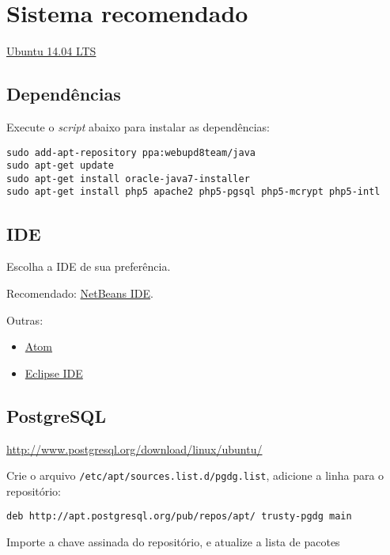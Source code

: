 \section{Sistema recomendado}\label{sistema-recomendado}

\href{http://www.ubuntu.com/download/desktop/}{Ubuntu 14.04 LTS}

\subsection{Dependências}\label{dependuxeancias}

Execute o \emph{script} abaixo para instalar as dependências:

\begin{verbatim}
sudo add-apt-repository ppa:webupd8team/java
sudo apt-get update
sudo apt-get install oracle-java7-installer
sudo apt-get install php5 apache2 php5-pgsql php5-mcrypt php5-intl
\end{verbatim}

\subsection{IDE}\label{ide}

Escolha a IDE de sua preferência.

Recomendado: \href{https://netbeans.org/}{NetBeans IDE}.

Outras:

\begin{itemize}
\itemsep1pt\parskip0pt
\item
  \href{https://atom.io/}{Atom}
\item
  \href{http://eclipse.org/pdt/}{Eclipse IDE}
\end{itemize}

\subsection{PostgreSQL}\label{postgresql}

\url{http://www.postgresql.org/download/linux/ubuntu/}

Crie o arquivo \texttt{/etc/apt/sources.list.d/pgdg.list}, adicione a
linha para o repositório:

\begin{verbatim}
deb http://apt.postgresql.org/pub/repos/apt/ trusty-pgdg main
\end{verbatim}

Importe a chave assinada do repositório, e atualize a lista de pacotes


